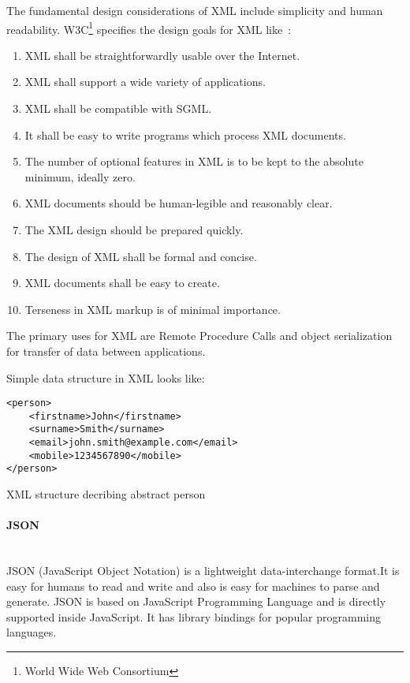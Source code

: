 The fundamental design considerations of XML include
simplicity and human readability\cite{NurseitovPRI09}.
W3C\footnote{World Wide Web Consortium} specifies the design goals for XML
like~\cite{w3c_xml}:
\begin{enumerate}
  \item XML shall be straightforwardly usable over the Internet.
  \item XML shall support a wide variety of applications.
  \item XML shall be compatible with SGML\footnotemark.
  \item It shall be easy to write programs which process XML documents.
  \item The number of optional features in XML is to be kept to the absolute minimum, ideally zero.
  \item XML documents should be human-legible and reasonably clear.
  \item The XML design should be prepared quickly.
  \item The design of XML shall be formal and concise.
  \item XML documents shall be easy to create.
  \item Terseness in XML markup is of minimal importance.  
\end{enumerate}

The primary uses for XML are Remote Procedure Calls and object serialization for transfer of
data between applications. 

Simple data structure in XML looks like:

\begin{listing}[H]
\begin{verbatim}
<person>
	<firstname>John</firstname>
	<surname>Smith</surname>
	<email>john.smith@example.com</email>
	<mobile>1234567890</mobile>
</person>
\end{verbatim}
\caption{XML structure decribing abstract person}
\label{lst:xml_person_example}
\end{listing}


\paragraph{JSON} ~\\
\label{sec:json_description}
JSON (JavaScript Object Notation) is a lightweight data-interchange
format\cite{json_org}.It is easy for humans to read and write and also is
easy for machines to parse and generate. JSON is based on JavaScript
Programming Language and is directly supported inside JavaScript. It has library
bindings for popular programming languages.

